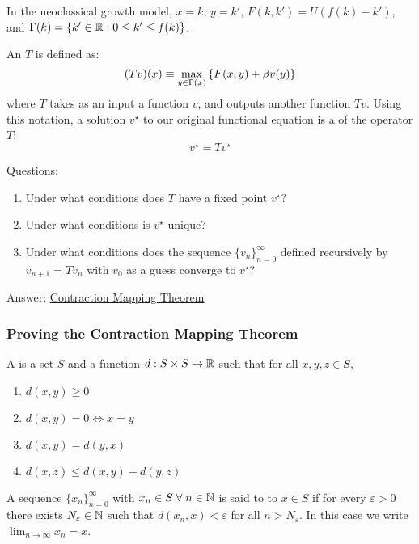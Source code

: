 \documentclass[10pt]{article}
\begin{document}
\begin{remark}
	In the neoclassical growth model, $x = k$, $y = k'$, $F(k,k') = U(f(k) - k')$, and $\Gamma(k) = \{k' \in \mathbb{R} : 0 \le k' \le f(k)\}$.
\end{remark}

\begin{definition}
	An  $T$ is defined as:
	\[
	(Tv)(x) \equiv \max_{y \in \Gamma(x)} \left\{ F(x,y) + \beta v(y) \right\}
	\]
	where $T$ takes as an input a function $v$, and outputs another function $Tv$. Using this notation, a solution $v^\star$ to our original functional equation is a  of the operator $T$:
	\[
	v^\star = Tv^\star
	\]
\end{definition}

Questions:
\begin{enumerate}
	\item Under what conditions does $T$ have a fixed point $v^\star$?
	\item Under what conditions is $v^\star$ unique?
	\item Under what conditions does the sequence $\{v_n\}_{n=0}^\infty$ defined recursively by $v_{n+1} = Tv_n$ with $v_0$ as a guess converge to $v^\star$?
\end{enumerate}
Answer: \href{https://en.wikipedia.org/wiki/Banach_fixed-point_theorem}{Contraction Mapping Theorem}

\subsubsection{Proving the Contraction Mapping Theorem}

\begin{definition}
	A  is a set $S$ and a function $d: S \times S \to \mathbb{R}$ such that for all $x,y,z \in S$,
	\begin{enumerate}
		\item $d(x,y) \ge 0$
		\item $d(x,y) = 0 \Leftrightarrow x = y$
		\item $d(x,y) = d(y,x)$
		\item $d(x,z) \le d(x,y) + d(y,z)$
	\end{enumerate}
\end{definition}

\begin{definition}
	A sequence $\{x_n\}_{n=0}^\infty$ with $x_n \in S \forall n \in \naturals$ is said to  to $x \in S$ if for every $\varepsilon > 0$ there exists $N_\varepsilon \in \mathbb{N}$ such that $d(x_n,x) < \varepsilon$ for all $n > N_\varepsilon$. In this case we write $\lim_{n\to\infty}x_n = x$.
\end{definition}
\end{document}
